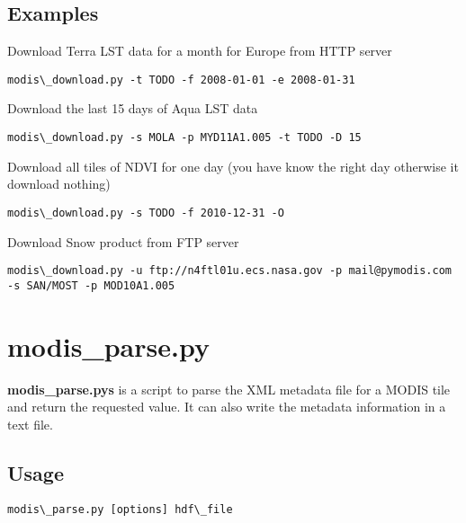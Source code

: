 \documentclass[a4paper,11pt,oneside]{sphinxmanual}
\begin{document}
\subsection{Examples}
\label{scripts/modis_download:examples}
Download Terra LST data for a month for Europe from HTTP server

\begin{Verbatim}[commandchars=\\\{\}]
modis\_download.py -t TODO -f 2008-01-01 -e 2008-01-31
\end{Verbatim}

Download the last 15 days of Aqua LST data

\begin{Verbatim}[commandchars=\\\{\}]
modis\_download.py -s MOLA -p MYD11A1.005 -t TODO -D 15
\end{Verbatim}

Download all tiles of NDVI for one day (you have know the right day otherwise it download nothing)

\begin{Verbatim}[commandchars=\\\{\}]
modis\_download.py -s TODO -f 2010-12-31 -O
\end{Verbatim}

Download Snow product from FTP server

\begin{Verbatim}[commandchars=\\\{\}]
modis\_download.py -u ftp://n4ftl01u.ecs.nasa.gov -p mail@pymodis.com
-s SAN/MOST -p MOD10A1.005
\end{Verbatim}
\newpage %

\section{modis\_parse.py}
\label{scripts/modis_parse:modis-parse-py}\label{scripts/modis_parse::doc}
\textbf{modis\_parse.pys} is a script to parse the XML metadata file for a MODIS
tile and return the requested value. It can also write the metadata information
in a text file.


\subsection{Usage}
\label{scripts/modis_parse:usage}
\begin{Verbatim}[commandchars=\\\{\}]
modis\_parse.py [options] hdf\_file
\end{Verbatim}
\end{document}
